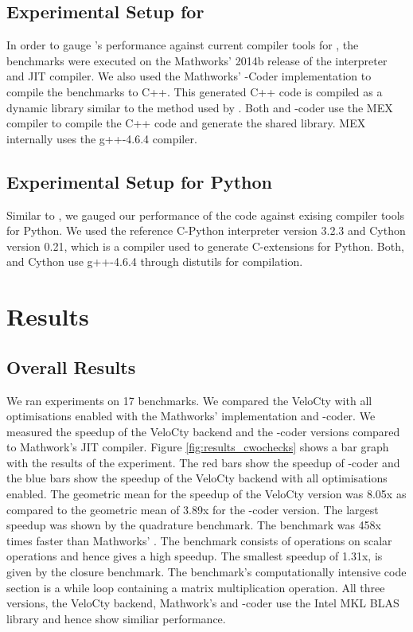 \subsection{Experimental Setup for \matlab}
 In order to gauge \velocty's performance against current compiler tools for \matlab, the \matlab benchmarks were executed on the Mathworks' 2014b release of the \matlab interpreter and JIT compiler. We also used the Mathworks' \matlab-Coder implementation to compile the benchmarks to C++. This generated C++ code is compiled as  a dynamic library similar to the method used by \velocty. Both \velocty and \matlab-coder use the MEX compiler to compile the C++ code and generate the shared library. MEX internally uses the g++-4.6.4 compiler. 
\subsection{Experimental Setup for Python}
 Similar to \matlab, we gauged our performance of the \velocty code against exising compiler tools for Python. We used the reference C-Python interpreter version 3.2.3  and Cython\cite{cython} version 0.21, which is a compiler used to generate C-extensions for Python. Both, \velocty and Cython use g++-4.6.4 through distutils for compilation. 

\section{\matlab Results}

\subsection{Overall Results}
We ran experiments on 17 \matlab benchmarks. We compared the VeloCty with all optimisations enabled  with the Mathworks' \matlab implementation and \matlab-coder. We measured the speedup of the VeloCty backend and the \matlab-coder versions compared to Mathwork's \matlab JIT compiler. Figure \ref{fig:results_cwochecks} shows a bar graph with the results of the experiment. The red bars show the speedup of \matlab-coder and the blue bars show the speedup of the VeloCty backend with all optimisations enabled. The geometric mean for the speedup of the VeloCty version was 8.05x as compared to the geometric mean of 3.89x for the \matlab-coder version. The largest speedup was shown by the quadrature benchmark. The benchmark was 458x times faster than Mathworks' \matlab. The benchmark consists of operations on scalar operations and hence gives a high speedup. The smallest speedup of 1.31x, is given by the closure benchmark. The benchmark's computationally intensive code section is a while loop containing a matrix multiplication operation. All three versions, the VeloCty backend, Mathwork's \matlab and \matlab-coder use the Intel MKL BLAS library and hence show similiar performance. 

